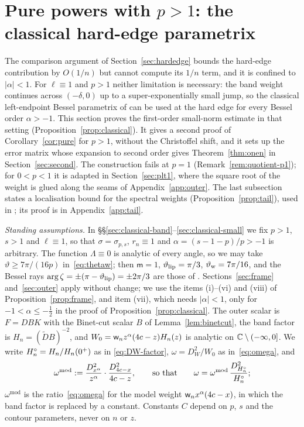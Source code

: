 
\section{\texorpdfstring{Pure powers with $p>1$: the classical hard-edge parametrix}{Pure powers with p>1: the classical hard-edge parametrix}}\label{sec:classical}

The comparison argument of Section~\ref{sec:hardedge} bounds the hard-edge contribution by $O(1/n)$ but cannot
compute its $1/n$ term, and it is confined to $|\alpha|<1$. For $\ell\equiv1$ and $p>1$ neither limitation is necessary:
the band weight continues across $(-\delta,0)$ up to a super-exponentially small jump, so the classical left-endpoint
Bessel parametrix of \cite[\S6]{KMVV} can be used at the hard edge for every Bessel order $\alpha>-1$. This section
proves the first-order small-norm estimate in that setting (Proposition~\ref{prop:classical}). It gives a second proof
of Corollary~\ref{cor:pure} for $p>1$, without the Christoffel shift, and it sets up the error matrix whose expansion
to second order gives Theorem~\ref{thm:onen} in Section~\ref{sec:second}. The construction fails at $p=1$
(Remark~\ref{rem:quotient-p1}); for $0<p<1$ it is adapted in Section~\ref{sec:plt1}, where the square root of the weight
is glued along the seams of Appendix~\ref{app:outer}. The last subsection states a localisation bound for the spectral weights
(Proposition~\ref{prop:tail}), used in \cite{Paper3}; its proof is in Appendix~\ref{app:tail}.

\emph{Standing assumptions.} In \S\S\ref{sec:classical-band}--\ref{sec:classical-small} we fix $p>1$, $s>1$ and
$\ell\equiv1$, so that $\sigma=\sigma_{p,s}$, $r_n\equiv1$ and $\alpha=(s-1-p)/p>-1$ is arbitrary. The function
$\Lambda\equiv0$ is analytic of every angle, so we may take $\vartheta\ge7\pi/(16p)$ in~\eqref{eq:thetaw}; then
$\mathsf m=1$, $\vartheta_{\mathrm{lip}}=\pi/3$, $\vartheta_{\mathrm{w}}=7\pi/16$, and the Bessel rays $\arg\zeta=\pm(\pi-\vartheta_{\mathrm{lip}})=\pm2\pi/3$ are those of
\cite[\S6]{KMVV}. Sections~\ref{sec:frame} and~\ref{sec:outer} apply without change; we use the items (i)--(vi) and
(viii) of Proposition~\ref{prop:frame}, and item (vii), which needs $|\alpha|<1$, only for $-1<\alpha\le-\frac12$ in the
proof of Proposition~\ref{prop:classical}. The outer scalar is $F=DBK$ with the
Binet-cut scalar $B$ of Lemma~\ref{lem:binetcut}, the band factor is $H_n=(\tilde DB)^{-2}$, and
$W_0=\mathsf w_n z^\alpha(4c-z)H_n(z)$ is analytic on $\mathbb{C}\setminus(-\infty,0]$. We write $H^{\circ}_n=H_n/H_n(0^+)$ as in
\eqref{eq:DW-factor}, $\omega=D_W^2/W_0$ as in~\eqref{eq:omega}, and
\begin{equation}\label{eq:omega-mod}
  \omega^{\mathrm{mod}}:=\frac{D_{x^\alpha}^2}{z^\alpha}\cdot\frac{D_{4c-x}^2}{4c-z},\qquad\text{so that}\qquad
  \omega=\omega^{\mathrm{mod}}\,\frac{D_{H^{\circ}_n}^2}{H^{\circ}_n};
\end{equation}
$\omega^{\mathrm{mod}}$ is the ratio~\eqref{eq:omega} for the model weight $\mathsf w_n x^\alpha(4c-x)$, in which the band
factor is replaced by a constant. Constants $C$ depend on $p$, $s$ and the contour parameters, never on $n$ or $z$.

